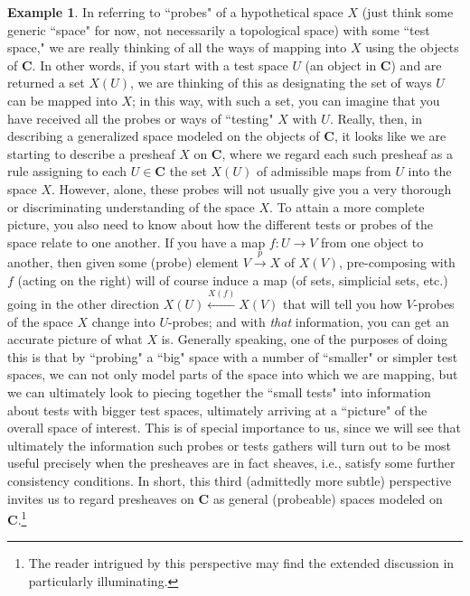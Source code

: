 \documentclass[11pt]{book}
\theoremstyle{definition}
\newtheorem{example}{Example}[section]
\theoremstyle{definition}
\theoremstyle{definition}
\theoremstyle{theorem}
\theoremstyle{definition}
\begin{document}
\begin{example}
	In referring to ``probes" of a hypothetical space $X$ (just think some generic ``space" for now, not necessarily a topological space) with some ``test space," we are really thinking of all the ways of mapping into $X$ using the objects of \textbf{C}. In other words, if you start with a test space $U$ (an object in \textbf{C}) and are returned a set $X(U)$, we are thinking of this as designating the set of ways $U$ can be mapped into $X$; in this way, with such a set, you can imagine that you have received all the probes or ways of ``testing" $X$ with $U$. Really, then, in describing a generalized space modeled on the objects of \textbf{C}, it looks like we are starting to describe a presheaf $X$ on \textbf{C}, where we regard each such presheaf as a rule assigning to each $U \in \textbf{C}$ the set $X(U)$ of admissible maps from $U$ into the space $X$. However, alone, these probes will not usually give you a very thorough or discriminating understanding of the space $X$. To attain a more complete picture, you also need to know about how the different tests or probes of the space relate to one another. If you have a map $f: U \rightarrow V$ from one object to another, then given some (probe) element $V \xrightarrow{p} X$ of $X(V)$, pre-composing with $f$ (acting on the right) will of course induce a map (of sets, simplicial sets, etc.) going in the other direction $X(U) \xleftarrow{X(f)} X(V)$ that will tell you how $V$-probes of the space $X$ change into $U$-probes; and with \textit{that} information, you can get an accurate picture of what $X$ is. Generally speaking, one of the purposes of doing this is that by ``probing" a ``big" space with a number of ``smaller" or simpler test spaces, we can not only model parts of the space into which we are mapping, but we can ultimately look to piecing together the ``small tests" into information about tests with bigger test spaces, ultimately arriving at a ``picture" of the overall space of interest. This is of special importance to us, since we will see that ultimately the information such probes or tests gathers will turn out to be most useful precisely when the presheaves are in fact sheaves, i.e., satisfy some further consistency conditions. In short, this third (admittedly more subtle) perspective invites us to regard presheaves on \textbf{C} as general (probeable) spaces modeled on \textbf{C}.\footnote{The reader intrigued by this perspective may find the extended discussion in \cite{nlab_authors_motivation_2019} particularly illuminating.}              
	\end{example}
\end{document}
